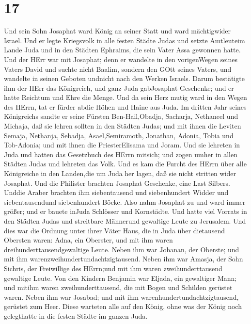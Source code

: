 \hypertarget{section-16}{%
\section{17}\label{section-16}}

 Und sein Sohn Josaphat ward König an seiner Statt und ward
mächtigwider Israel.  Und er legte Kriegsvolk in alle festen
Städte Judas und setzte Amtleuteim Lande Juda und in den Städten
Ephraims, die sein Vater Assa gewonnen hatte.  Und der HErr
war mit Josaphat; denn er wandelte in den vorigenWegen seines Vaters
David und suchte nicht Baalim,  sondern den GOtt seines
Vaters, und wandelte in seinen Geboten undnicht nach den Werken Israels.
 Darum bestätigte ihm der HErr das Königreich, und ganz Juda
gabJosaphat Geschenke; und er hatte Reichtum und Ehre die Menge.
 Und da sein Herz mutig ward in den Wegen des HErrn, tat er
fürder abdie Höhen und Haine aus Juda.  Im dritten Jahr
seines Königreichs sandte er seine Fürsten Ben-Hail,Obadja, Sacharja,
Nethaneel und Michaja, daß sie lehren sollten in den Städten Judas;
 und mit ihnen die Leviten Semaja, Nethanja, Sebadja,
Asael,Semiramoth, Jonathan, Adonia, Tobia und Tob-Adonia; und mit ihnen
die PriesterElisama und Joram.  Und sie lehreten in Juda und
hatten das Gesetzbuch des HErrn mitsich; und zogen umher in allen
Städten Judas und lehreten das Volk.  Und es kam die Furcht
des HErrn über alle Königreiche in den Landen,die um Juda her lagen, daß
sie nicht stritten wider Josaphat.  Und die Philister
brachten Josaphat Geschenke, eine Last Silbers. Unddie Araber brachten
ihm siebentausend und siebenhundert Widder und siebentausendund
siebenhundert Böcke.  Also nahm Josaphat zu und ward immer
größer; und er bauete inJuda Schlösser und Kornstädte.  Und
hatte viel Vorrats in den Städten Judas und streitbare Männerund
gewaltige Leute zu Jerusalem.  Und dies war die Ordnung
unter ihrer Väter Haus, die in Juda über dietausend Obersten waren:
Adna, ein Oberster, und mit ihm waren dreihunderttausendgewaltige Leute.
 Neben ihm war Johanan, der Oberste; und mit ihm
warenzweihundertundachtzigtausend.  Neben ihm war Amasja,
der Sohn Sichris, der Freiwillige des HErrn;und mit ihm waren
zweihunderttausend gewaltige Leute.  Von den Kindern
Benjamin war Eljada, ein gewaltiger Mann; und mitihm waren
zweihunderttausend, die mit Bogen und Schilden gerüstet waren.
 Neben ihm war Josabad; und mit ihm
warenhundertundachtzigtausend, gerüstet zum Heer.  Diese
warteten alle auf den König, ohne was der König noch gelegthatte in die
festen Städte im ganzen Juda.

